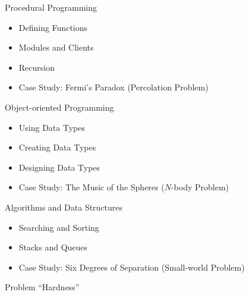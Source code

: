 \documentclass[8pt,a4paper,compress]{beamer}
\begin{document}
\begin{frame}[fragile]
\pause

Procedural Programming
\begin{itemize}
\item Defining Functions
\item Modules and Clients
\item Recursion
\item Case Study: Fermi's Paradox (Percolation Problem)
\end{itemize}

\pause
\bigskip

Object-oriented Programming
\begin{itemize}
\item Using Data Types
\item Creating Data Types
\item Designing Data Types
\item Case Study: The Music of the Spheres ($N$-body Problem)
\end{itemize}

\pause
\bigskip

Algorithms and Data Structures
\begin{itemize}
\item Searching and Sorting
\item Stacks and Queues
\item Case Study: Six Degrees of Separation (Small-world Problem)
\end{itemize}

\pause
\bigskip

Problem ``Hardness''
\end{frame}
\end{document}

